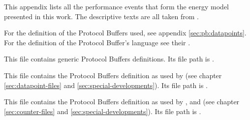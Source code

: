 \appendix
\appendixpage
\addappheadtotoc

\renewcommand\thesection{\Alph{section}}

\label{appendix:chosen-events}

This appendix lists all the performance events that form the energy model
presented in this work. The descriptive texts are all taken from
\cite{intel2011events}.





\label{sec:fmt:datapoints}

For the definition of the Protocol Buffers used, see appendix
\ref{sec:pb:datapoints}. For the definition of the Protocol Buffer's language
see their
.



\label{sec:pb:generic}

This file contains generic Protocol Buffers definitions. Its file path is
.



\label{sec:pb:datapoints}

This file contains the Protocol Buffers definition as used by \JWTlibdp{} (see
chapter \ref{sec:datapoint-files} and \ref{sec:special-developments}). Its file
path is .


\label{sec:pb:counter-files}

This file contains the Protocol Buffers definition as used by \JWTdd{},
\JWTbsle{} and \JWTde{} (see chapter \ref{sec:counter-files} and
\ref{sec:special-developments}). Its file path is
.


